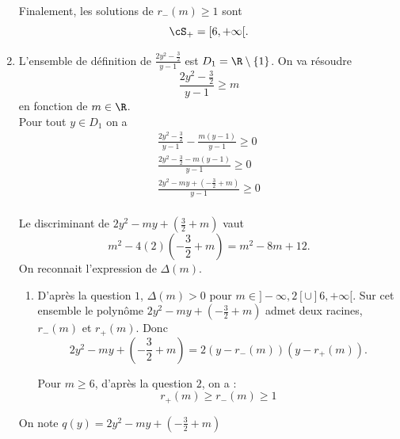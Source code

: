 \begin{correction}
\begin{enumerate}
Finalement, les solutions de $r_-(m) \geq 1$ sont 
$$\cS_+ = [ 6,+\infty[.$$


\item L'ensemble de définition de  $ \frac{2y^2-\frac{3}{2}}{y-1}$ est $D_1 =\R\setminus\{  1\}$. 
On va résoudre \begin{equation}\tag{$I_4(m)$}
 \frac{2y^2-\frac{3}{2}}{y-1}\geq m
\end{equation}
en fonction de $m\in \R$.\\

Pour tout $y \in D_1$  on a 
\begin{align*}
  \frac{2y^2-\frac{3}{2}}{y-1}- \frac{m(y-1)}{y-1}\geq  0\\
    \frac{2y^2-\frac{3}{2} -m(y-1)}{y-1}\geq  0\\
        \frac{2y^2-my + (-\frac{3}{2} +m)}{y-1}\geq  0\\
\end{align*}

Le discriminant de $2y^2-my + (\frac{3}{2} +m)$ vaut 
$$m^2 -4(2) (-\frac{3}{2} +m) = m^2 -8m +12.$$
On reconnait l'expression de $\Delta(m)$. 

\begin{enumerate}
\item D'après la question $1$,  $\Delta(m) >0 $ pour $m \in  ]-\infty, 2[\cup ] 6,+\infty[$. Sur cet ensemble le polynôme $2y^2-my + (-\frac{3}{2} +m) $ admet deux racines, $r_-(m)$ et $r_+(m)$. Donc 
$$2y^2-my + (-\frac{3}{2} +m)  = 2 ( y-r_-(m) ) (y-r_+(m)).$$

Pour $m\geq 6$, d'après la question $2$, on a :
$$r_+(m) \geq r_-(m) \geq 1 $$

\end{enumerate}
On note $q(y)=2y^2-my + (-\frac{3}{2} +m) $


\end{enumerate}
\end{correction}
